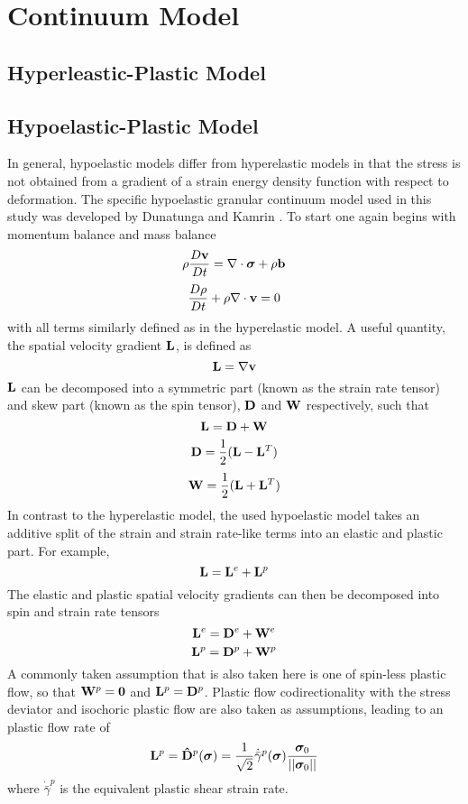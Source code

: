 \chapter{Continuum Model}

\section{Hyperleastic-Plastic Model}

\section{Hypoelastic-Plastic Model}
In general, hypoelastic models differ from hyperelastic models in that the stress is not obtained from a gradient of a strain energy density function with respect to deformation. The specific hypoelastic granular continuum model used in this study was developed by Dunatunga and Kamrin \cite{Dunatunga:2015:Continuum}. To start one again begins with momentum balance and mass balance
$$\rho\frac{D\bold{v}}{Dt} = \nabla\cdot\bm{\sigma} + \rho\bold{b}$$
$$\frac{D\rho}{Dt} + \rho\nabla\cdot\bold{v}=0$$
with all terms similarly defined as in the hyperelastic model. A useful quantity, the spatial velocity gradient $\bold{L}$, is defined as
$$\bold{L}=\nabla\bold{v}$$
$\bold{L}$ can be decomposed into a symmetric part (known as the strain rate tensor) and skew part (known as the spin tensor), $\bold{D}$ and $\bold{W}$ respectively, such that
$$\bold{L}=\bold{D}+\bold{W}$$
$$\bold{D}=\frac{1}{2}(\bold{L}-\bold{L}^T)$$
$$\bold{W}=\frac{1}{2}(\bold{L}+\bold{L}^T)$$
In contrast to the hyperelastic model, the used hypoelastic model takes an additive split of the strain and strain rate-like terms into an elastic and plastic part. For example,
$$\bold{L}=\bold{L}^e+\bold{L}^p$$
The elastic and plastic spatial velocity gradients can then be decomposed into spin and strain rate tensors
$$\bold{L}^e=\bold{D}^e+\bold{W}^e$$
$$\bold{L}^p=\bold{D}^p+\bold{W}^p$$
A commonly taken assumption that is also taken here is one of spin-less plastic flow, so that $\bold{W}^p=\bold{0}$ and $\bold{L}^p=\bold{D}^p$. Plastic flow codirectionality with the stress deviator and isochoric plastic flow are also taken as assumptions, leading to an plastic flow rate of
$$\bold{L}^p=\bold{\hat{D}}^p(\bm{\sigma})=\frac{1}{\sqrt{2}}\dot{\bar{\gamma}}^p(\bm{\sigma})\frac{\bm{\sigma}_0}{||\bm{\sigma}_0||}$$
where $\dot{\bar{\gamma}}^p$ is the equivalent plastic shear strain rate.

